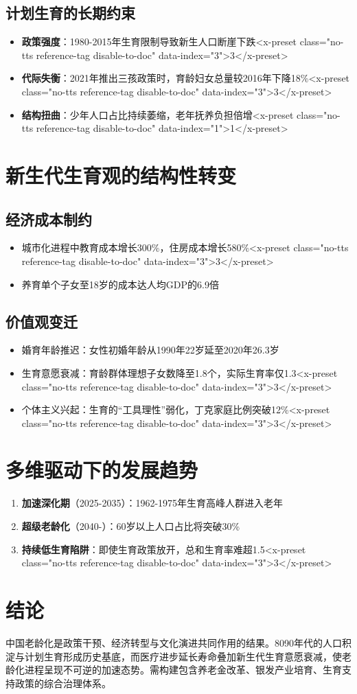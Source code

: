 \documentclass[UTF8]{ctexart}
\begin{document}
\subsection{计划生育的长期约束}
\begin{itemize}
  \item \textbf{政策强度}：1980-2015年生育限制导致新生人口断崖下跌<x-preset class="no-tts reference-tag disable-to-doc" data-index="3">3</x-preset>
  \item \textbf{代际失衡}：2021年推出三孩政策时，育龄妇女总量较2016年下降18\%<x-preset class="no-tts reference-tag disable-to-doc" data-index="3">3</x-preset>
  \item \textbf{结构扭曲}：少年人口占比持续萎缩，老年抚养负担倍增<x-preset class="no-tts reference-tag disable-to-doc" data-index="1">1</x-preset>
\end{itemize}

\section{新生代生育观的结构性转变}
\subsection{经济成本制约}
\begin{itemize}
  \item 城市化进程中教育成本增长300\%，住房成本增长580\%<x-preset class="no-tts reference-tag disable-to-doc" data-index="3">3</x-preset>
  \item 养育单个子女至18岁的成本达人均GDP的6.9倍
\end{itemize}

\subsection{价值观变迁}
\begin{itemize}
  \item 婚育年龄推迟：女性初婚年龄从1990年22岁延至2020年26.3岁
  \item 生育意愿衰减：育龄群体理想子女数降至1.8个，实际生育率仅1.3<x-preset class="no-tts reference-tag disable-to-doc" data-index="3">3</x-preset>
  \item 个体主义兴起：生育的“工具理性”弱化，丁克家庭比例突破12\%<x-preset class="no-tts reference-tag disable-to-doc" data-index="3">3</x-preset>
\end{itemize}

\section{多维驱动下的发展趋势}
\begin{enumerate}
  \item \textbf{加速深化期}（2025-2035）：1962-1975年生育高峰人群进入老年
  \item \textbf{超级老龄化}（2040-）：60岁以上人口占比将突破30\%
  \item \textbf{持续低生育陷阱}：即使生育政策放开，总和生育率难超1.5<x-preset class="no-tts reference-tag disable-to-doc" data-index="3">3</x-preset>
\end{enumerate}

\section*{结论}
中国老龄化是政策干预、经济转型与文化演进共同作用的结果。8090年代的人口积淀与计划生育形成历史基底，而医疗进步延长寿命叠加新生代生育意愿衰减，使老龄化进程呈现不可逆的加速态势。需构建包含养老金改革、银发产业培育、生育支持政策的综合治理体系。
\end{document}
